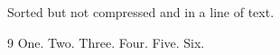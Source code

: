 \documentclass{article}
\begin{document}
Sorted but not compressed \cite{c,a,b} and \cite{f,e,d,a} in a line of text.

\begin{thebibliography}{9}
 One.
 Two.
 Three.
 Four.
 Five.
 Six.
\end{thebibliography}
\end{document}
